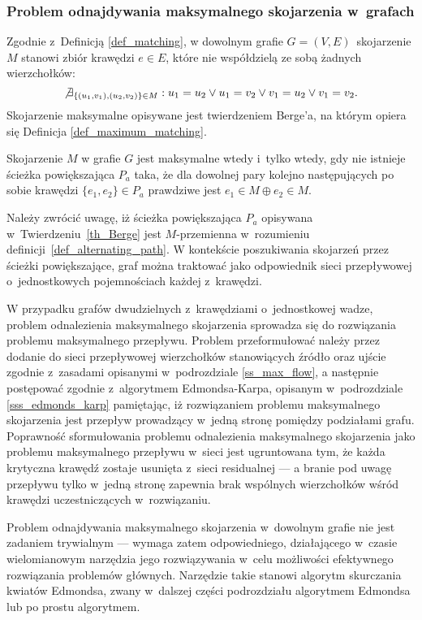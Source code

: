 \subsubsection{\textbf{Problem odnajdywania maksymalnego skojarzenia w~grafach}}
\par{
  Zgodnie z~Definicją \ref{def_matching}, w dowolnym grafie $G=(V,E)$~skojarzenie $M$ stanowi zbiór krawędzi $e \in E$, które nie współdzielą ze sobą żadnych wierzchołków: \[\not\exists_{\{(u_1,v_1), (u_2, v_2)\} \in M}:{u_1 = u_2 \lor u_1 = v_2 \lor v_1 = u_2 \lor v_1 = v_2}.\]
  Skojarzenie maksymalne opisywane jest twierdzeniem Berge'a, na którym opiera się Definicja \ref{def_maximum_matching}.
  \begin{theorem}
    Skojarzenie $M$ w grafie $G$ jest maksymalne wtedy i~tylko wtedy, gdy nie istnieje ścieżka powiększająca $P_a$ taka, że dla dowolnej pary kolejno następujących po sobie krawędzi $\{e_1, e_2\} \in P_a$ prawdziwe jest $e_1 \in M \oplus e_2 \in M$.
  \end{theorem}
   Należy zwrócić uwagę, iż ścieżka powiększająca $P_a$ opisywana w~Twierdzeniu~\ref{th_Berge} jest $M$-przemienna w~rozumieniu definicji~\ref{def_alternating_path}.
   W kontekście poszukiwania skojarzeń przez ścieżki powiększające, graf można traktować jako odpowiednik sieci przepływowej o~jednostkowych pojemnościach każdej z~krawędzi.
}
\par{
  W przypadku grafów dwudzielnych z~krawędziami o~jednostkowej wadze, problem odnalezienia maksymalnego skojarzenia sprowadza się do rozwiązania problemu maksymalnego przepływu.
  Problem przeformułować należy przez dodanie do sieci przepływowej wierzchołków stanowiących źródło oraz ujście zgodnie z~zasadami opisanymi w~podrozdziale \ref{ss_max_flow}, a następnie postępować zgodnie z~algorytmem Edmondsa-Karpa, opisanym w~podrozdziale \ref{sss_edmonds_karp} pamiętając, iż rozwiązaniem problemu maksymalnego skojarzenia jest przepływ prowadzący w~jedną stronę pomiędzy podziałami grafu.
  Poprawność sformułowania problemu odnalezienia maksymalnego skojarzenia jako problemu maksymalnego przepływu w~sieci jest ugruntowana tym, że każda krytyczna krawędź zostaje usunięta z~sieci residualnej --- a branie pod uwagę przepływu tylko w~jedną stronę zapewnia brak wspólnych wierzchołków wśród krawędzi uczestniczących w~rozwiązaniu.
}
\par{
  Problem odnajdywania maksymalnego skojarzenia w~dowolnym grafie nie jest zadaniem trywialnym --- wymaga zatem odpowiedniego, działającego w~czasie wielomianowym narzędzia jego rozwiązywania w~celu możliwości efektywnego rozwiązania problemów głównych.
  Narzędzie takie stanowi algorytm skurczania kwiatów Edmondsa, zwany w~dalszej części podrozdziału algorytmem Edmondsa lub po prostu algorytmem.
}
